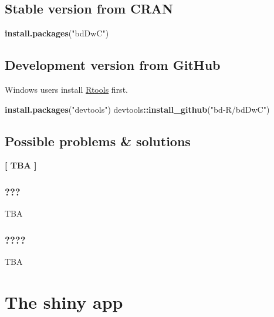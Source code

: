 \documentclass[]{book}
\newenvironment{Shaded}{\begin{snugshade}}{\end{snugshade}}
\newcommand{\KeywordTok}[1]{\textcolor[rgb]{0.13,0.29,0.53}{\textbf{#1}}}
\newcommand{\StringTok}[1]{\textcolor[rgb]{0.31,0.60,0.02}{#1}}
\newcommand{\OperatorTok}[1]{\textcolor[rgb]{0.81,0.36,0.00}{\textbf{#1}}}
\newcommand{\NormalTok}[1]{#1}
\theoremstyle{definition}
\theoremstyle{definition}
\theoremstyle{definition}
\theoremstyle{remark}
\begin{document}
\section{Stable version from CRAN}\label{stable-version-from-cran}

\begin{Shaded}
\begin{Highlighting}[]
\KeywordTok{install.packages}\NormalTok{(}\StringTok{"bdDwC"}\NormalTok{)}
\end{Highlighting}
\end{Shaded}

\section{Development version from
GitHub}\label{development-version-from-github}

Windows users install
\href{https://cran.r-project.org/bin/windows/Rtools/}{Rtools} first.

\begin{Shaded}
\begin{Highlighting}[]
\KeywordTok{install.packages}\NormalTok{(}\StringTok{"devtools"}\NormalTok{)}
\NormalTok{devtools}\OperatorTok{::}\KeywordTok{install_github}\NormalTok{(}\StringTok{"bd-R/bdDwC"}\NormalTok{)}
\end{Highlighting}
\end{Shaded}

\section{Possible problems \&
solutions}\label{possible-problems-solutions}

\textbf{{{[} TBA {]}}}

\subsection{???}\label{section}

TBA

\subsection{????}\label{section-1}

TBA

\chapter{The shiny app}\label{the-shiny-app}
\end{document}
